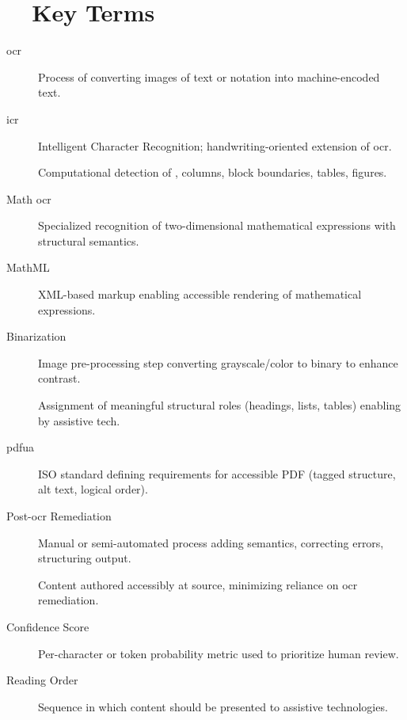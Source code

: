 \section{~~Key Terms}
\label{sec:ocr-key-terms}
\begin{description}
	\item[\gls{ocr}] Process of converting images of text or notation into machine-encoded text.
	\item[\gls{icr}] Intelligent Character Recognition; handwriting-oriented extension of \gls{ocr}.
	\item[] Computational detection of , columns, block boundaries, tables, figures.
	\item[Math \gls{ocr}] Specialized recognition of two-dimensional mathematical expressions with structural semantics.
	\item[MathML] XML-based markup enabling accessible rendering of mathematical expressions.
	\item[Binarization] Image pre-processing step converting grayscale/color to binary to enhance contrast.
	\item[] Assignment of meaningful structural roles (headings, lists, tables) enabling  by assistive tech.
	\item[\gls{pdfua}] ISO standard defining requirements for accessible PDF (tagged structure, alt text, logical order).
	\item[Post-\gls{ocr} Remediation] Manual or semi-automated process adding semantics, correcting errors, structuring output.
	\item[] Content authored accessibly at source, minimizing reliance on \gls{ocr} remediation.
	\item[Confidence Score] Per-character or token probability metric used to prioritize human review.
	\item[Reading Order] Sequence in which content should be presented to assistive technologies.
\end{description}

